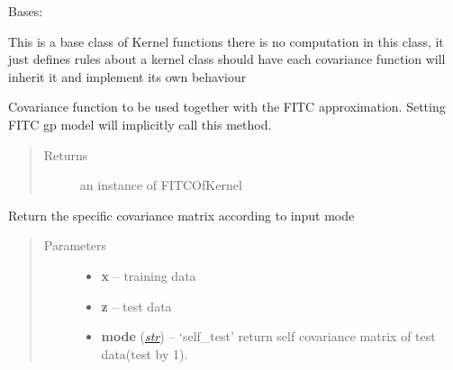 \documentclass[letterpaper,10pt,english]{sphinxmanual}
\begin{document}

\begin{fulllineitems}
\label{pyGPs.Core:pyGPs.Core.cov.Kernel}
Bases: 

This is a base class of Kernel functions
there is no computation in this class, it just defines rules about a kernel class should have
each covariance function will inherit it and implement its own behaviour

\begin{fulllineitems}
\label{pyGPs.Core:pyGPs.Core.cov.Kernel.fitc}
Covariance function to be used together with the FITC approximation.
Setting FITC gp model will implicitly call this method.
\begin{quote}\begin{description}
\item[{Returns}] \leavevmode
an instance of FITCOfKernel

\end{description}\end{quote}

\end{fulllineitems}


\begin{fulllineitems}
\label{pyGPs.Core:pyGPs.Core.cov.Kernel.getCovMatrix}
Return the specific covariance matrix according to input mode
\begin{quote}\begin{description}
\item[{Parameters}] \leavevmode\begin{itemize}
\item {} 
\textbf{x} -- training data

\item {} 
\textbf{z} -- test data

\item {} 
\textbf{mode} (\href{http://docs.python.org/library/functions.html\#str}{\emph{str}}) -- `self\_test' return self covariance matrix of test data(test by 1).

\end{itemize}


\end{description}
\end{quote}
\end{fulllineitems}
\end{fulllineitems}
\end{document}
